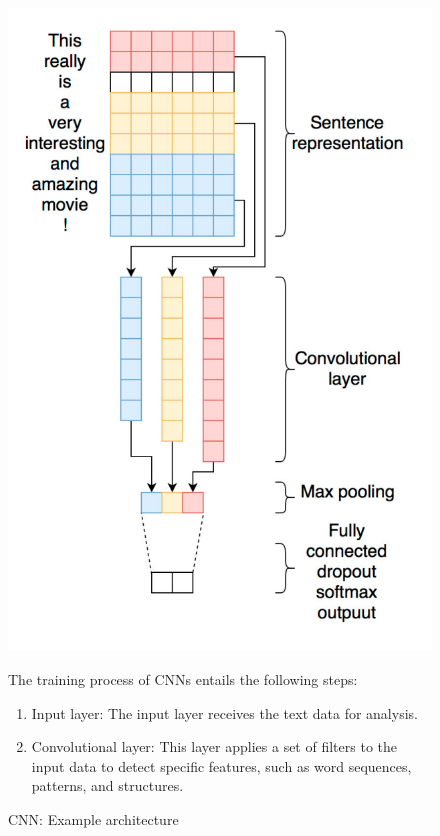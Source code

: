 \documentclass[a4paper]{article}
\begin{document}
\begin{figure}[H]
    \centering
    \begin{minipage}{0.48\textwidth}
      \centering
      \includegraphics[width=\linewidth]{./images/CNN_architecture.png}
      \caption{CNN: Example architecture \cite{ref_cnn1}}
      \label{fig.CNN_1}
    \end{minipage}\hfill
    \begin{minipage}{0.48\textwidth}
        The training process of CNNs entails the following steps:
        \begin{enumerate}
            \item Input layer: The input layer receives the text data for analysis.
            \item Convolutional layer: This layer applies a set of filters to the input data to detect specific features, such as word sequences, patterns, and structures.

\end{enumerate}
\end{minipage}
\end{figure}
\end{document}
